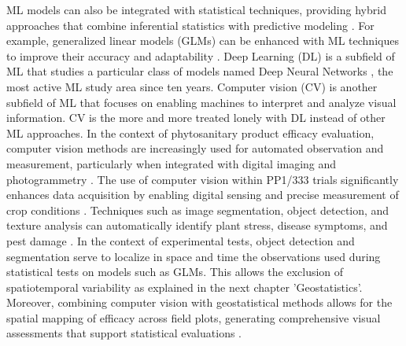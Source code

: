 \documentclass[12pt,a4paper,oneside]{report}
\begin{document}
ML models can also be integrated with statistical techniques, providing hybrid approaches 
that combine inferential statistics with predictive modeling \cite{hastie_elements_2009}. 
For example, generalized linear models (GLMs) can be enhanced with ML techniques to improve 
their accuracy and adaptability \cite{salinas_ruiz_generalized_2023}. 
Deep Learning (DL) is a subfield of ML that studies a particular class of models named Deep
Neural Networks \cite{goodfellow_deep_2016}, the most active ML study area since ten years.
Computer vision (CV) is another subfield of 
ML that focuses on enabling machines to interpret and analyze visual information. 
CV is the more and more treated lonely with DL instead of other ML approaches. In 
the context of phytosanitary product efficacy evaluation, computer vision methods are 
increasingly used for automated observation and measurement, particularly when integrated 
with digital imaging and photogrammetry \cite{lu_instancefusion_2020}. The use of computer vision 
within PP1/333 trials significantly enhances data acquisition by enabling digital sensing 
and precise measurement of crop conditions \cite{barbedo_automatic_2014,arnal_barbedo_digital_2013}. Techniques such as image 
segmentation, object detection, and texture analysis can automatically identify plant stress, 
disease symptoms, and pest damage \cite{kamilaris_deep_2018}. In the context of experimental tests, object detection and 
segmentation serve to localize in space and time the observations used during statistical tests on models such as GLMs.
This allows the exclusion of spatiotemporal variability as explained in the next chapter 'Geostatistics'.
Moreover, combining computer 
vision with geostatistical methods allows for the spatial mapping of efficacy across field plots, 
generating comprehensive visual assessments that support statistical evaluations 
\cite{koldasbayeva_challenges_2024}.
\end{document}
